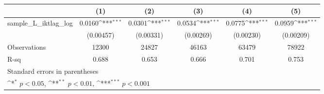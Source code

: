 {
\def\sym#1{\ifmmode^{#1}\else\(^{#1}\)\fi}
\begin{tabular}{l*{5}{c}}
\hline\hline
                &\multicolumn{1}{c}{(1)}         &\multicolumn{1}{c}{(2)}         &\multicolumn{1}{c}{(3)}         &\multicolumn{1}{c}{(4)}         &\multicolumn{1}{c}{(5)}         \\
\hline
sample\_L\_iktlag\_log&   0.0160\sym{***}&   0.0301\sym{***}&   0.0534\sym{***}&   0.0775\sym{***}&   0.0959\sym{***}\\
                &(0.00457)         &(0.00331)         &(0.00269)         &(0.00230)         &(0.00209)         \\
\hline
Observations    &    12300         &    24827         &    46163         &    63479         &    78922         \\
R-sq            &    0.688         &    0.653         &    0.666         &    0.701         &    0.753         \\
\hline\hline
\multicolumn{6}{l}{\footnotesize Standard errors in parentheses}\\
\multicolumn{6}{l}{\footnotesize \sym{*} \(p<0.05\), \sym{**} \(p<0.01\), \sym{***} \(p<0.001\)}\\
\end{tabular}
}
